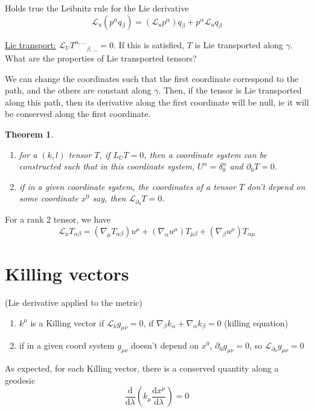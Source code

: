 \documentclass[a4paper]{book}
\newtheorem{theorem}{Theorem}[section]
\theoremstyle{definition}
\theoremstyle{remark}
\begin{document}
Holds true the Leibnitz rule for the Lie derivative
\begin{equation}
    \mathcal{L}_u(p^\alpha q_\beta) = (\mathcal{L}_u p^\alpha)q_\beta + p^\alpha \mathcal{L}_u  q_\beta
\end{equation}

\underline{Lie transport:} $\mathcal{L}_U T^{\alpha, \dots}_{\qquad \beta, \dots} = 0$. If this is satisfied, $T$ is Lie transported along $\gamma$. What are the properties of Lie transported tensors? \par \medskip 

We can change the coordinates such that the first coordinate correspond to the path, and the others are constant along $\gamma$. Then, if the tensor is Lie transported along this path, then its derivative along the first coordinate will be null, ie it will be conserved along the first coordinate. 

\begin{theorem}
    \begin{enumerate}
        \item for a $(k, l)$ tensor $T$, if $L_U T = 0$, then a coordinate system can be constructed such that in this coordinate system, $U^\alpha = \delta^\alpha_0$ and $\partial_0 T= 0$.
        \item if in a given coordinate system, the coordinates of a tensor $T$ don't depend on some coordinate $x^0$ say, then $\mathcal{L}_{\partial_0} T= 0$.  
    \end{enumerate}
\end{theorem}
For a rank 2 tensor, we have
\begin{equation}
    \mathcal{L}_u T_{\alpha\beta} = (\nabla_\mu T_{\alpha\beta})u^\mu + (\nabla_\alpha u^\mu)T_{\mu\beta} + (\nabla_\beta u^\mu)T_{\alpha\mu} 
\end{equation}

\section{Killing vectors} (Lie derivative applied to the metric)
\begin{enumerate}
    \item $k^\mu$ is a Killing vector if $\mathcal{L}_k g_{\mu\nu} = 0$, if $\nabla _\beta k_\alpha + \nabla _\alpha k_\beta = 0$ (killing equation)
    \item if in a given coord system $g_{\mu\nu}$ doesn't depend on $x^0$, $\partial_0 g_{\mu\nu} = 0$, so $\mathcal{L}_{\partial_0}g_{\mu\nu} = 0$
\end{enumerate}
As expected, for each Killing vector, there is a conserved quantity along a geodesic 
\begin{equation}
    \frac{\text{d}}{\text{d}\lambda}\left(k_\mu \frac{\text{d}x^\mu}{\text{d}\lambda}\right) = 0
\end{equation}
\end{document}
